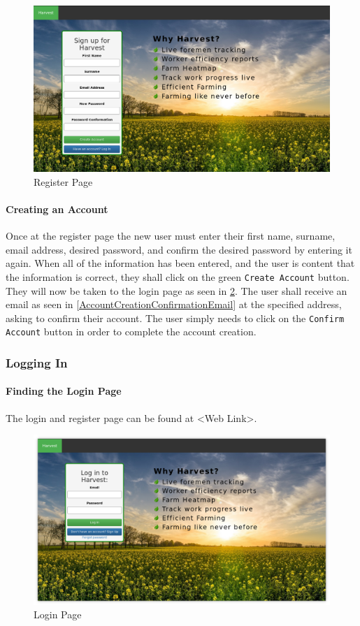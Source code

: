 \documentclass[11pt]{article}
\begin{document}
\begin{figure}
 \centering
 \includegraphics[width=12cm, keepaspectratio]{Images/webRegister-Page.png}
 \caption{Register Page}
 \label{RegisterPage}
\end{figure}

\paragraph{Creating an Account}Once at the register page the new user must enter their first name, surname, email address, desired password, and confirm the desired password by entering it again. When all of the information has been entered, and the user is content that the information is correct, they shall click on the green \texttt{Create Account} button. They will now be taken to the login page as seen in \ref{LoginPage}. The user shall receive an email as seen in \ref{AccountCreationConfirmationEmail} at the specified address, asking to confirm their account. The user simply needs to click on the \texttt{Confirm Account} button in order to complete the account creation.

\subsubsection{Logging In}
\paragraph{Finding the Login Page}The login and register page can be found at <Web Link>.

\begin{figure}
 \centering
 \includegraphics[width=12cm, keepaspectratio]{Images/webLogin.png}
 \caption{Login Page}
 \label{LoginPage}
\end{figure}
\end{document}
